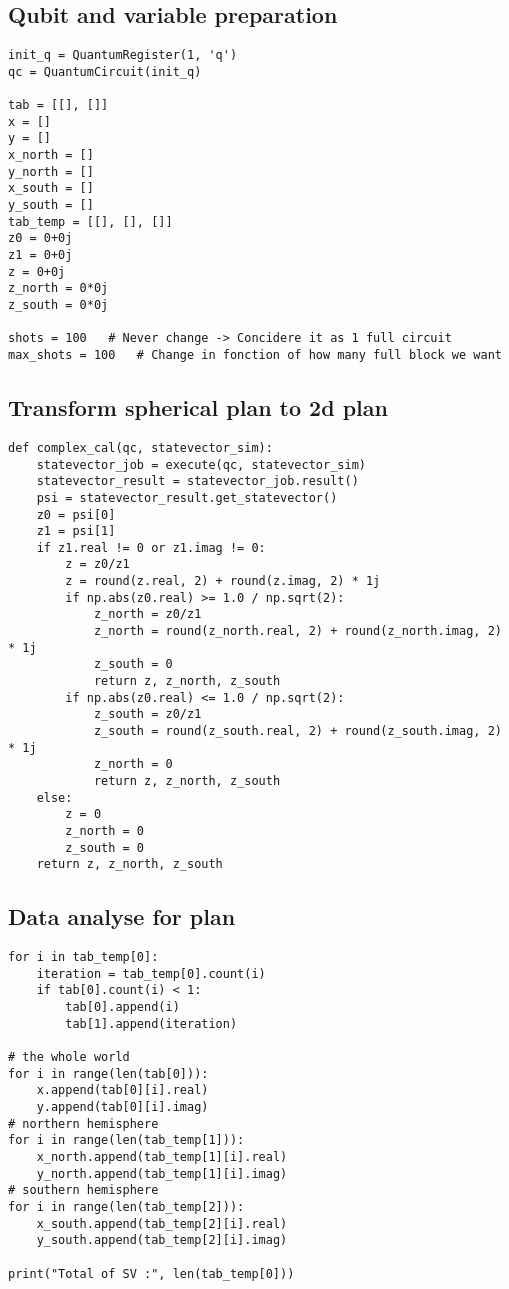 \subsection{Qubit and variable preparation}
\begin{lstlisting}
init_q = QuantumRegister(1, 'q')
qc = QuantumCircuit(init_q)

tab = [[], []]
x = []
y = []
x_north = []
y_north = []
x_south = []
y_south = []
tab_temp = [[], [], []]
z0 = 0+0j
z1 = 0+0j
z = 0+0j
z_north = 0*0j
z_south = 0*0j

shots = 100   # Never change -> Concidere it as 1 full circuit
max_shots = 100   # Change in fonction of how many full block we want 
\end{lstlisting}

\subsection{Transform spherical plan to 2d plan}

\begin{lstlisting}
def complex_cal(qc, statevector_sim):
    statevector_job = execute(qc, statevector_sim)
    statevector_result = statevector_job.result()
    psi = statevector_result.get_statevector()
    z0 = psi[0]
    z1 = psi[1]
    if z1.real != 0 or z1.imag != 0:
        z = z0/z1
        z = round(z.real, 2) + round(z.imag, 2) * 1j
        if np.abs(z0.real) >= 1.0 / np.sqrt(2):
            z_north = z0/z1
            z_north = round(z_north.real, 2) + round(z_north.imag, 2) * 1j
            z_south = 0
            return z, z_north, z_south
        if np.abs(z0.real) <= 1.0 / np.sqrt(2):
            z_south = z0/z1
            z_south = round(z_south.real, 2) + round(z_south.imag, 2) * 1j
            z_north = 0
            return z, z_north, z_south
    else:
        z = 0
        z_north = 0
        z_south = 0
    return z, z_north, z_south
\end{lstlisting}

\subsection{Data analyse for plan}

\begin{lstlisting}
for i in tab_temp[0]:
    iteration = tab_temp[0].count(i)
    if tab[0].count(i) < 1:
        tab[0].append(i)
        tab[1].append(iteration)

# the whole world
for i in range(len(tab[0])):
    x.append(tab[0][i].real)
    y.append(tab[0][i].imag)
# northern hemisphere
for i in range(len(tab_temp[1])):
    x_north.append(tab_temp[1][i].real)
    y_north.append(tab_temp[1][i].imag)
# southern hemisphere
for i in range(len(tab_temp[2])):
    x_south.append(tab_temp[2][i].real)
    y_south.append(tab_temp[2][i].imag)

print("Total of SV :", len(tab_temp[0]))
\end{lstlisting}

